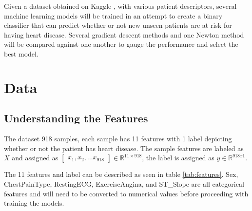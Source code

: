 \documentclass[12pt,conference]{IEEEtran}
\begin{document}
Given a dataset obtained on Kaggle \cite{kaggle}, with various patient descriptors, several machine learning models will be trained in an attempt to create a binary classifier that can predict whether or not new unseen patients are at risk for having heart disease. Several gradient descent methods and one Newton method will be compared against one another to gauge the performance and select the best model.

\section{Data}
\subsection{Understanding the Features}
The dataset 918 samples, each sample has 11 features with 1 label depicting whether or not the patient has heart disease. The sample features are labeled as $X$ and assigned as $\begin{bmatrix}x_1, x_2, ... x_{918}\end{bmatrix} \in \mathbb{R}^{11\times 918}$, the label is assigned as $y \in \mathbb{R}^{918x1}$.

The 11 features and label can be described as seen in table \ref{tab:features}. Sex, ChestPainType, RestingECG, ExerciseAngina, and ST\_Slope are all categorical features and will need to be converted to numerical values before proceeding with training the models. 
 
\end{document}
